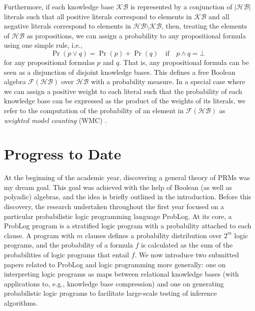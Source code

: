 \documentclass{article}
\begin{document}
Furthermore, if each knowledge base $\mathcal{KB}$ is represented by a
conjunction of $|\mathcal{HB}|$ literals such that all positive literals
correspond to elements in $\mathcal{KB}$ and all negative literals correspond to
elements in $\mathcal{HB} \setminus \mathcal{KB}$, then, treating the elements
of $\mathcal{HB}$ as propositions, we can assign a probability to any
propositional formula using one simple rule, i.e.,
\[
  \Pr(p \lor q) = \Pr(p) + \Pr(q) \quad \text{if} \quad p \land q = \bot
\]
for any propositional formulas $p$ and $q$. That is, any propositional formula
can be seen as a disjunction of disjoint knowledge bases. This defines a
free Boolean algebra $\mathscr{F}(\mathcal{HB})$ over $\mathcal{HB}$ with a
probability measure. In a special case where we can assign a positive weight to
each literal such that the probability of each knowledge base can be expressed
as the product of the weights of its literals, we refer to the computation of
the probability of an element in $\mathscr{F}(\mathcal{HB})$ as \emph{weighted
  model counting} (WMC) \cite{DBLP:journals/ai/ChaviraD08}.

\section{Progress to Date}

At the beginning of the academic year, discovering a general theory of PRMs
was my dream goal. This goal was achieved with the help of Boolean (as
well as polyadic) algebras, and the idea is briefly outlined in the
introduction. Before this discovery, the research undertaken throughout the
first year focused on a particular probabilistic logic programming language
ProbLog. At its core, a ProbLog program is a stratified logic program with a
probability attached to each clause. A program with $m$ clauses defines a
probability distribution over $2^m$ logic programs, and the probability of a
formula $f$ is calculated as the sum of the probabilities of logic programs that
entail $f$. We now introduce two submitted papers related to ProbLog and logic
programming more generally: one on interpreting logic programs as maps between
relational knowledge bases (with applications to, e.g., knowledge base
compression) and one on generating probabilistic logic programs to facilitate
large-scale testing of inference algorithms.
\end{document}
